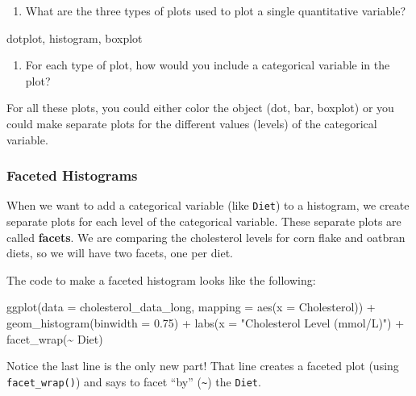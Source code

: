 \documentclass[
  letterpaper,
  DIV=11,
  numbers=noendperiod]{scrartcl}
\newenvironment{Shaded}{\begin{snugshade}}{\end{snugshade}}
\newcommand{\AttributeTok}[1]{\textcolor[rgb]{0.40,0.45,0.13}{#1}}
\newcommand{\FloatTok}[1]{\textcolor[rgb]{0.68,0.00,0.00}{#1}}
\newcommand{\FunctionTok}[1]{\textcolor[rgb]{0.28,0.35,0.67}{#1}}
\newcommand{\NormalTok}[1]{\textcolor[rgb]{0.00,0.23,0.31}{#1}}
\newcommand{\SpecialCharTok}[1]{\textcolor[rgb]{0.37,0.37,0.37}{#1}}
\newcommand{\StringTok}[1]{\textcolor[rgb]{0.13,0.47,0.30}{#1}}
\providecommand{\tightlist}{%
  \setlength{\itemsep}{0pt}\setlength{\parskip}{0pt}}\usepackage{longtable,booktabs,array}
\begin{document}
\begin{enumerate}
\def\labelenumi{\arabic{enumi}.}
\setcounter{enumi}{7}
\tightlist
\item
  What are the three types of plots used to plot a single quantitative
  variable?
\end{enumerate}

dotplot, histogram, boxplot

\begin{enumerate}
\def\labelenumi{\arabic{enumi}.}
\setcounter{enumi}{8}
\tightlist
\item
  For each type of plot, how would you include a categorical variable in
  the plot?
\end{enumerate}

For all these plots, you could either color the object (dot, bar,
boxplot) or you could make separate plots for the different values
(levels) of the categorical variable.

\hypertarget{faceted-histograms}{%
\subsubsection{Faceted Histograms}\label{faceted-histograms}}

When we want to add a categorical variable (like \texttt{Diet}) to a
histogram, we create separate plots for each level of the categorical
variable. These separate plots are called \textbf{facets}. We are
comparing the cholesterol levels for corn flake and oatbran diets, so we
will have two facets, one per diet.

The code to make a faceted histogram looks like the following:

\begin{Shaded}
\begin{Highlighting}[]
\FunctionTok{ggplot}\NormalTok{(}\AttributeTok{data =}\NormalTok{ cholesterol\_data\_long, }
       \AttributeTok{mapping =} \FunctionTok{aes}\NormalTok{(}\AttributeTok{x =}\NormalTok{ Cholesterol)) }\SpecialCharTok{+} 
  \FunctionTok{geom\_histogram}\NormalTok{(}\AttributeTok{binwidth =} \FloatTok{0.75}\NormalTok{) }\SpecialCharTok{+} 
  \FunctionTok{labs}\NormalTok{(}\AttributeTok{x =} \StringTok{"Cholesterol Level (mmol/L)"}\NormalTok{) }\SpecialCharTok{+}
  \FunctionTok{facet\_wrap}\NormalTok{(}\SpecialCharTok{\textasciitilde{}}\NormalTok{ Diet)}
\end{Highlighting}
\end{Shaded}

Notice the last line is the only new part! That line creates a faceted
plot (using \texttt{facet\_wrap()}) and says to facet ``by''
(\texttt{\textasciitilde{}}) the \texttt{Diet}.
\end{document}
